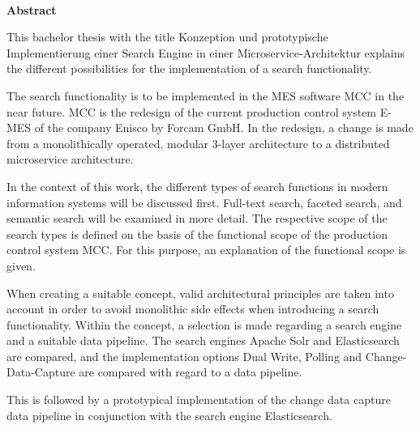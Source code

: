 
~

\vspace{17.1mm}

\begin{flushleft}
    \textbf{\huge{}Abstract}{\huge\par}
\par\end{flushleft}

This bachelor thesis with the title \glqq Konzeption und prototypische Implementierung einer Search Engine in einer Microservice-Architektur\grqq{} explains the different possibilities for the implementation of a search functionality.

The search functionality is to be implemented in the MES software \glqq MCC\grqq{} in the near future. \glqq MCC\grqq{} is the redesign of the current production control system \glqq E-MES\grqq{} of the company Enisco by Forcam GmbH. In the redesign, a change is made from a monolithically operated, modular 3-layer architecture to a distributed microservice architecture.

In the context of this work, the different types of search functions in modern information systems will be discussed first. Full-text search, faceted search, and semantic search will be examined in more detail. The respective scope of the search types is defined on the basis of the functional scope of the production control system \glqq MCC\grqq{}. For this purpose, an explanation of the functional scope is given.

When creating a suitable concept, valid architectural principles are taken into account in order to avoid monolithic side effects when introducing a search functionality. Within the concept, a selection is made regarding a search engine and a suitable data pipeline. The search engines \glqq Apache Solr\grqq{} and \glqq Elasticsearch\grqq{} are compared, and the implementation options \glqq Dual Write\grqq{}, \glqq Polling\grqq{} and \glqq Change-Data-Capture\grqq{} are compared with regard to a data pipeline.

This is followed by a prototypical implementation of the change data capture data pipeline in conjunction with the search engine \glqq Elasticsearch\grqq{}. 
